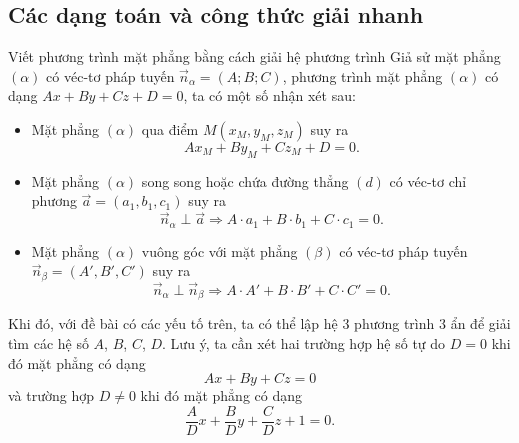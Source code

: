 \subsection{Các dạng toán và công thức giải nhanh}
\begin{dang}{Viết phương trình mặt phẳng bằng cách giải hệ phương trình}
	Giả sử mặt phẳng $(\alpha)$ có véc-tơ pháp tuyến $\vec{n}_\alpha=(A;B;C)$, phương trình mặt phẳng $(\alpha)$ có dạng $Ax+By+Cz+D=0$, ta có một số nhận xét sau:
	\begin{itemize}
		\item Mặt phẳng $(\alpha)$ qua điểm $M(x_M,y_M,z_M)$ suy ra $$Ax_M+By_M+Cz_M+D=0.$$
		\item Mặt phẳng $(\alpha)$ song song hoặc chứa đường thẳng $(d)$ có véc-tơ chỉ phương $\vec{a}=(a_1,b_1,c_1)$ suy ra $$\vec{n}_\alpha\perp \vec{a}\Rightarrow A\cdot a_1+B\cdot b_1+C\cdot c_1=0.$$
		\item Mặt phẳng $(\alpha)$ vuông góc với mặt phẳng $(\beta)$ có véc-tơ pháp tuyến $\vec{n}_\beta=(A',B',C')$ suy ra $$\vec{n}_\alpha\perp \vec{n}_\beta\Rightarrow A\cdot A'+B\cdot B'+C\cdot C'=0.$$
	\end{itemize}
	Khi đó, với đề bài có các yếu tố trên, ta có thể lập hệ $3$ phương trình $3$ ẩn để giải tìm các hệ số $A$, $B$, $C$, $D$. Lưu ý, ta cần xét hai trường hợp hệ số tự do $D=0$ khi đó mặt phẳng có dạng $$Ax+By+Cz=0$$ và trường hợp $D\ne 0$ khi đó mặt phẳng có dạng $$\dfrac{A}{D}x+\dfrac{B}{D}y+\dfrac{C}{D}z+1=0.$$
\end{dang}
